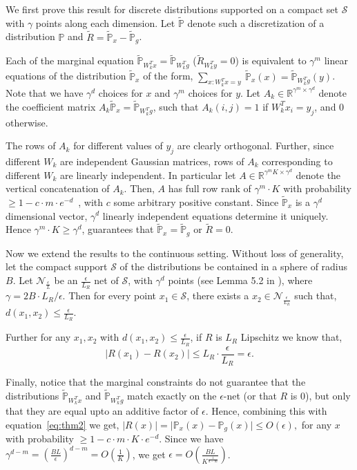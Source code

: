 \documentclass{article}
\newcommand{\R}{\mathbb{R}}
\newcommand{\px}{\mathbb{P}_{x}}
\newcommand{\pg}{\mathbb{P}_{g}}
\newcommand{\ptx}{\mathbb{\tilde{P}}_{x}}
\newcommand{\ptg}{\mathbb{\tilde{P}}_{g}}
\newcommand{\ptwix}{\mathbb{\tilde{P}}_{W_k^Tx}}
\newcommand{\ptwig}{\mathbb{\tilde{P}}_{W_k^Tg}}
\begin{document}
We first prove this result for discrete distributions supported on a compact set $\mathcal{S}$ with $\gamma$ points along each dimension. Let $\mathbb{\tilde{P}}$ denote such a discretization of a distribution $\mathbb{P}$ and $\tilde{R} = \ptx -\ptg$.

Each of the marginal equation $\ptwix =\ptwig$ ($\tilde{R}_{W_k^Ty} =0 $) is equivalent to $ \gamma^m$ linear equations of the distribution $\ptx$ of the form, $\sum_{x: W_k^Tx=y}~ \ptx(x) =\ptwig(y)$. Note that we have $\gamma^d$ choices for $x$ and $\gamma^m$ choices for $y$. Let $A_k \in \R^{\gamma^m \times \gamma^d}$ denote the coefficient matrix $A_k \ptx =\ptwig$, such that $A_k(i, j) = 1$ if $W_k^T x_i =y_j$, and 0 otherwise.

The rows of $A_k$ for different values of $y_j$ are clearly orthogonal. Further, since different $W_k$ are independent Gaussian matrices, rows of $A_k$ corresponding to different $W_k$ are linearly independent. In particular let $A \in \R^{\gamma^m K \times \gamma^d}$ denote the vertical concatenation of $A_k$. Then, $A$ has full row rank of $\gamma^m\cdot K$ with probability $\geq 1 -c\cdot m\cdot e^{-d}$~\citep{vershynin2010introduction}, with $c$ some arbitrary positive constant. Since $\ptx$ is a $\gamma^d$ dimensional vector, $\gamma^d$ linearly independent equations determine it uniquely. Hence $\gamma^m\cdot K \geq \gamma^d$, guarantees that $\ptx =\ptg$ or $\tilde{R} =0$.

Now we extend the results to the continuous setting. Without loss of generality, let the compact support $\mathcal{S}$ of the distributions be contained in a sphere of radius $B$. Let $\mathcal{N}_{\frac{\epsilon}{L}}$ be an $\frac{\epsilon}{L_R}$ net of $\mathcal{S}$, with $\gamma^d$ points (see Lemma 5.2 in \cite{vershynin2010introduction}), where $\gamma=2B\cdot L_R/\epsilon$. Then for every point $x_1 \in \mathcal{S}$, there exists a $x_2 \in \mathcal{N}_{\frac{\epsilon}{L_R}}$ such that, $d(x_1,x_2) \leq \frac{\epsilon}{L_R}$.

Further for any $x_1, x_2$ with $d(x_1, x_2) \leq  \frac{\epsilon}{L_R}$, if $R$ is $L_R$ Lipschitz we know that, \begin{equation}\label{eq:thm2}\lvert R(x_1) -R(x_2)\rvert \leq L_R \cdot \frac{\epsilon}{L_R} =\epsilon.\end{equation}

Finally, notice that the marginal constraints do not guarantee that the distributions $\ptwix$ and $\ptwig$ match exactly on the $\epsilon$-net (or that $R$ is 0), but only that they are equal upto an additive factor of $\epsilon$. Hence, combining this with equation~\ref{eq:thm2} we get,
$|R(x)| = \lvert \px(x) -\pg(x)\rvert \leq O(\epsilon),$ for any $x$ with probability $\geq 1- c \cdot m \cdot K \cdot e^{-d}$.  Since we have $\gamma^{d-m} = \left(\frac{BL}{\epsilon}\right)^{d-m} =O(\frac{1}{K})$, we get  $\epsilon = O(\frac{BL}{K^{\frac{1}{d-m}}})$. 
\end{document}
